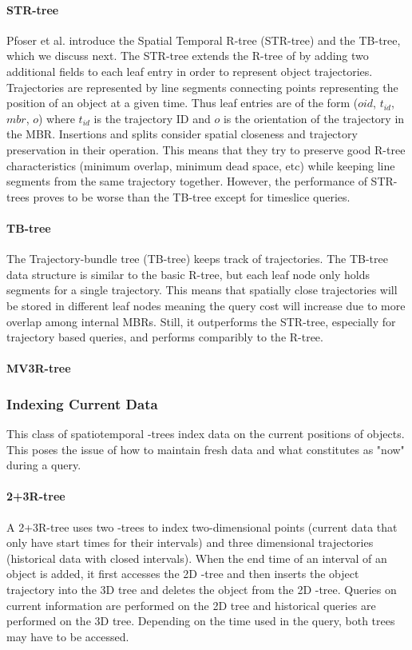 \paragraph{STR-tree} Pfoser et al. introduce the Spatial Temporal R-tree 
(STR-tree) and the TB-tree, which we discuss next\cite{pfoser2000novel}. 
The STR-tree extends the R-tree of \cite{guttman84} by adding two additional
fields to each leaf entry in order to represent object trajectories. 
Trajectories are represented by line segments connecting points representing
the position of an object at a given time. Thus leaf entries are of the 
form ($oid$, $t_{id}$, $mbr$, $o$) where $t_{id}$ is the trajectory ID and 
$o$ is the orientation of the trajectory in the MBR. Insertions and splits 
consider spatial closeness and trajectory preservation in their operation.
This means that they try to preserve good R-tree characteristics (minimum 
overlap, minimum dead space, etc) while keeping line segments from the 
same trajectory together. However, the performance of STR-trees proves to
be worse than the TB-tree except for timeslice queries.

\paragraph{TB-tree} The Trajectory-bundle tree (TB-tree) \cite{pfoser2000novel}
keeps track of trajectories. The TB-tree data structure is similar to the 
basic R-tree, but each leaf node only holds segments for a single 
trajectory. This means that spatially close trajectories will be stored in 
different leaf nodes meaning the query cost will increase due to more 
overlap among internal MBRs. Still, it outperforms the STR-tree, especially
for trajectory based queries, and performs comparibly to the R-tree. 

\paragraph{MV3R-tree} \cite{tao2001mv3r}

\subsubsection{Indexing Current Data}
This class of spatiotemporal \rbase-trees index data on the current positions of 
objects. This poses the issue of how to maintain fresh data and what constitutes 
as "now" during a query. 

\paragraph{2+3R-tree} A 2+3R-tree\cite{nascimento1999evaluation} uses two 
\rbase-trees to index two-dimensional points (current data that only have
start times for their intervals) and three dimensional trajectories 
(historical data with closed intervals). When the end time of an 
interval of an object is added, it first accesses the 2D \rbase-tree
and then inserts the object trajectory into the 3D tree and deletes the 
object from the 2D \rbase-tree. Queries on current information are 
performed on the 2D tree and historical queries are performed on the 3D
tree. Depending on the time used in the query, both trees may have to be 
accessed.

